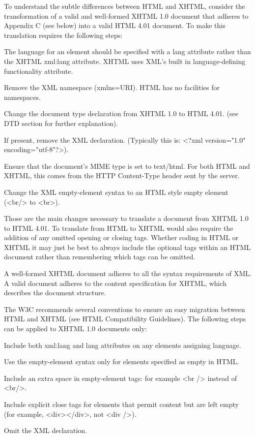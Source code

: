 To understand the subtle differences between HTML and XHTML, consider the transformation of a valid and well-formed XHTML 1.0 document that adheres to Appendix C (see below) into a valid HTML 4.01 document. To make this translation requires the following steps:

\begin{compactenum}
\item The language for an element should be specified with a lang attribute rather than the XHTML xml:lang attribute. XHTML uses XML's built in language-defining functionality attribute.
\item Remove the XML namespace (xmlns=URI). HTML has no facilities for namespaces.
\item Change the document type declaration from XHTML 1.0 to HTML 4.01. (see DTD section for further explanation).
\item If present, remove the XML declaration. (Typically this is: <?xml version="1.0" encoding="utf-8"?>).
\item Ensure that the document's MIME type is set to text/html. For both HTML and XHTML, this comes from the HTTP Content-Type header sent by the server.
\item Change the XML empty-element syntax to an HTML style empty element (<br/> to <br>).

\end{compactenum}
Those are the main changes necessary to translate a document from XHTML 1.0 to HTML 4.01. To translate from HTML to XHTML would also require the addition of any omitted opening or closing tags. Whether coding in HTML or XHTML it may just be best to always include the optional tags within an HTML document rather than remembering which tags can be omitted.

A well-formed XHTML document adheres to all the syntax requirements of XML. A valid document adheres to the content specification for XHTML, which describes the document structure.

The W3C recommends several conventions to ensure an easy migration between HTML and XHTML (see HTML Compatibility Guidelines). The following steps can be applied to XHTML 1.0 documents only:

\begin{compactitem}
\item Include both xml:lang and lang attributes on any elements assigning language.
\item Use the empty-element syntax only for elements specified as empty in HTML.
\item Include an extra space in empty-element tags: for example <br /> instead of <br/>.
\item Include explicit close tags for elements that permit content but are left empty (for example, <div></div>, not <div />).
\item Omit the XML declaration.
\end{compactitem}

